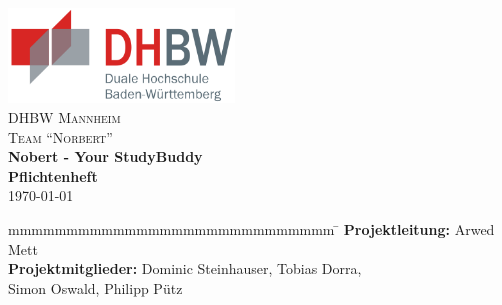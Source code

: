 
\begin{titlepage}
	\begin{center}
        \includegraphics[width=0.45\textwidth]{images/dhbw.png}~\\[3cm]
        \textsc{\LARGE DHBW Mannheim}\\[1.5em]
        \textsc{\LARGE Team \enquote{Norbert}}\\[1.5em]
        { \huge \bfseries Nobert - Your StudyBuddy \\[0.5cm] }
        { \LARGE \bfseries Pflichtenheft \\[0.4cm] }
        \today
	\end{center}
	\vfill
	\begin{spacing}{1.2}
	\begin{tabbing}
		mmmmmmmmmmmmmmmmmmmmmmmmmmmm \= \kill
        \textbf{Projektleitung:}        \> Arwed Mett\\
        \textbf{Projektmitglieder:}       \> Dominic Steinhauser, Tobias Dorra,\\
     								   \> Simon Oswald, Philipp Pütz\\
	\end{tabbing}
	\end{spacing}
\end{titlepage}
